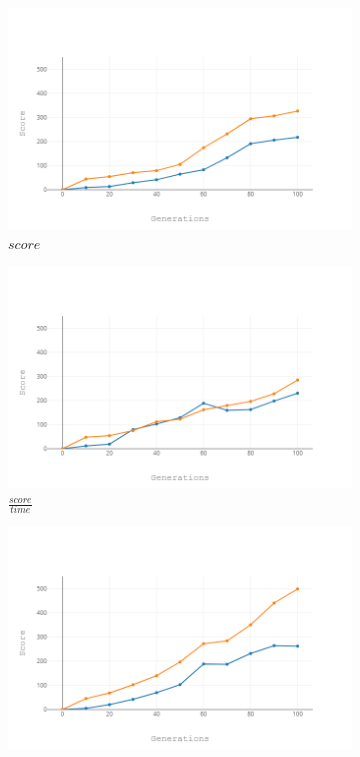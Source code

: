\documentclass[a4paper,12pt,pagesize,headsepline,bibtotoc,titlepage,abstracton]{scrartcl}
\begin{document}
\begin{figure}[hbp]
\begin{center}
\begin{subfigure}[b]{0.45\textwidth}
    \includegraphics[width=\textwidth]{images/score.png}
    \caption{$score$}
\end{subfigure}
\begin{subfigure}[b]{0.45\textwidth}
    \includegraphics[width=\textwidth]{images/scoredivtime.png}
    \caption{$\frac{score}{time}$}
\end{subfigure}
\begin{subfigure}[b]{0.45\textwidth}
    \includegraphics[width=\textwidth]{images/scoreminustime.png}

\end{subfigure}
\end{center}
\end{figure}
\end{document}
